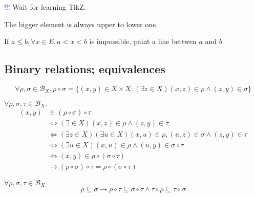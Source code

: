 \begin{Sym}    \textcolor{blue}{!!!} Wait for learning TikZ.
    
    The bigger element is always upper to lower one.

    If $a\leq b, \forall x\in E, a<x<b$ is impossible, paint a line bettwen $a$ and $b$
\end{Sym}

\subsection[4]{Binary relations; equivalences}


\begin{Def}
    \[
        \forall \rho, \sigma \in \mathcal{B}_X, \rho \circ \sigma =\{(x,y)\in X\times X: (\exists z\in X)(x,z)\in \rho \wedge (z,y)\in \sigma\}
    \]
\end{Def}

\begin{Prop}
    $\forall \rho, \sigma, \tau \in \mathcal{B}_X.$
    \begin{align*}
        (x,y) &\in (\rho \circ \sigma) \circ \tau   \\
        &\Leftrightarrow (\exists \in X)(x,z)\in \rho \wedge (z,y)\in \tau  \\
        &\Leftrightarrow (\exists z\in X)(\exists u \in X)(x,u)\in \rho,(u,z)\in \sigma \wedge (z,y) \in \tau   \\
        &\Leftrightarrow (\exists u \in X)(x,u)\in \rho \wedge (u,y)\in \sigma \circ \tau   \\
        &\Leftrightarrow (x,y)\in \rho \circ (\sigma \circ \tau)    \\
        &\rightarrow (\rho \circ \sigma) \circ \tau = \rho \circ (\sigma \circ \tau)
    \end{align*}
\end{Prop}

\begin{Rmk}
    $\forall \rho, \sigma, \tau \in \mathcal{B}_X$
    \[\rho \subseteq \sigma \rightarrow \rho \circ \tau \subseteq \sigma \circ \tau \wedge \tau \circ \rho \subseteq \tau \circ \sigma\]
\end{Rmk}

